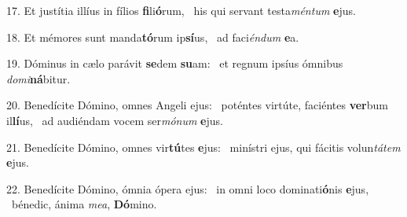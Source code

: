 17. Et justítia illíus in fílios \textbf{fi}li\textbf{ó}rum, \ast\  his qui servant testa\textit{mén}\textit{tum} \textbf{e}jus.\

18. Et mémores sunt manda\textbf{tó}rum ip\textbf{sí}us, \ast\  ad faci\textit{én}\textit{dum} \textbf{e}a.\

19. Dóminus in cælo parávit \textbf{se}dem \textbf{su}am: \ast\  et regnum ipsíus ómnibus \textit{do}\textit{mi}\textbf{ná}bitur.\

20. Benedícite Dómino, omnes Angeli ejus: \dag\  poténtes virtúte, faciéntes \textbf{ver}bum il\textbf{lí}us, \ast\  ad audiéndam vocem ser\textit{mó}\textit{num} \textbf{e}jus.\

21. Benedícite Dómino, omnes vir\textbf{tú}tes \textbf{e}jus: \ast\  minístri ejus, qui fácitis volun\textit{tá}\textit{tem} \textbf{e}jus.\

22. Benedícite Dómino, ómnia ópera ejus: \dag\  in omni loco dominati\textbf{ó}nis \textbf{e}jus, \ast\  bénedic, ánima \textit{me}\textit{a}, \textbf{Dó}mino.\

